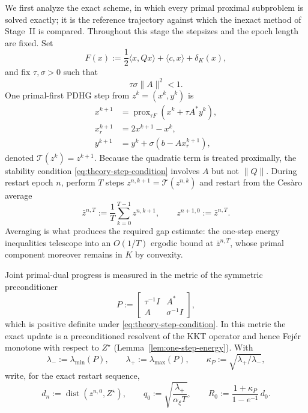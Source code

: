\documentclass[letterpaper]{article} %
\theoremstyle{definition}
\theoremstyle{remark}
\begin{document}
We first analyze the exact scheme, in which every primal proximal subproblem
is solved exactly; it is the reference trajectory against which the inexact
method of Stage~II is compared.  Throughout this stage the stepsizes and the
epoch length are fixed.  Set
\[
    F(x)
    :=
    \frac12\langle x,Qx\rangle+\langle c,x\rangle+\delta_K(x),
\]
and fix $\tau,\sigma>0$ such that
\begin{equation}
\label{eq:theory-step-condition}
    \tau\sigma\|A\|^2<1.
\end{equation}
One primal-first PDHG step from $z^k=(x^k,y^k)$ is
\begin{subequations}
\label{eq:theory-pdhg-step}
\begin{align}
    x^{k+1}
    &=
    \operatorname{prox}_{\tau F}(x^k+\tau A^*y^k),
    \label{eq:theory-pdhg-primal}\\
    x_r^{k+1}
    &=
    2x^{k+1}-x^k,\\
    y^{k+1}
    &=
    y^k+\sigma(b-Ax_r^{k+1}),
    \label{eq:theory-pdhg-dual}
\end{align}
\end{subequations}
denoted $\mathcal T(z^k)=z^{k+1}$.  Because the quadratic term is treated
proximally, the stability condition \eqref{eq:theory-step-condition}
involves $A$ but not $\|Q\|$.  During restart epoch $n$, perform $T$ steps
$z^{n,k+1}=\mathcal T(z^{n,k})$ and restart from the Ces\`aro average
\begin{equation}
\label{eq:theory-epoch-average}
    \bar z^{n,T}
    :=
    \frac1T\sum_{k=0}^{T-1}z^{n,k+1},
    \qquad
    z^{n+1,0}:=\bar z^{n,T}.
\end{equation}
Averaging is what produces the required gap estimate: the one-step energy
inequalities telescope into an $O(1/T)$ ergodic bound at $\bar z^{n,T}$,
whose primal component moreover remains in $K$ by convexity.

Joint primal-dual progress is measured in the metric of the symmetric
preconditioner
\begin{equation}
\label{eq:theory-preconditioner}
    P
    :=
    \begin{bmatrix}
        \tau^{-1}I&A^*\\
        A&\sigma^{-1}I
    \end{bmatrix},
\end{equation}
which is positive definite under \eqref{eq:theory-step-condition}.  In this
metric the exact update is a preconditioned resolvent of the KKT operator
and hence Fej\'er monotone with respect to $Z^\star$
(Lemma~\ref{lem:one-step-energy}).  With
\begin{equation}
\label{eq:theory-metric-constants}
    \lambda_-:=\lambda_{\min}(P),
    \qquad
    \lambda_+:=\lambda_{\max}(P),
    \qquad
    \kappa_P:=\sqrt{\lambda_+/\lambda_-},
\end{equation}
write, for the exact restart sequence,
\[
    d_n:=\operatorname{dist}(z^{n,0},Z^\star),
    \qquad
    q_0:=\sqrt{\frac{\lambda_+}{\alpha_\xi T}},
    \qquad
    R_0:=\frac{1+\kappa_P}{1-e^{-1}}\,d_0.
\]
\end{document}
